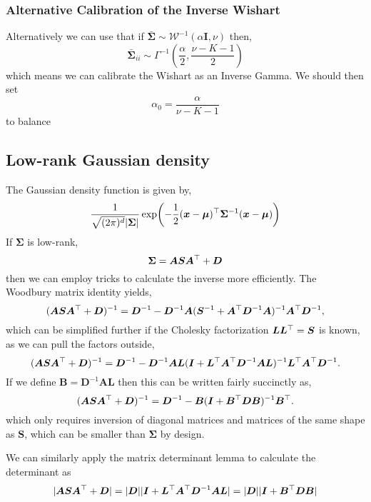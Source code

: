 \documentclass{article}
\newcommand{\mix}{\bm{A}}
\newcommand{\mean}{\mu}
\newcommand{\meanvec}{\bm{\mean}}
\newcommand{\compcov}{\bar{\bm{\Sigma}}}
\begin{document}
\subsubsection{Alternative Calibration of the Inverse Wishart}
Alternatively we can use that if $\compcov\sim \mathcal{W}^{-1}(\alpha\bm{I},\nu)$ then,
\begin{equation}
\compcov_{ii}\sim \Gamma^{-1}\left(\frac{\alpha}{2},\frac{\nu-K-1}{2}\right)
\end{equation}
which means we can calibrate the Wishart as an Inverse Gamma. We should then set 
\begin{equation}
\alpha_0=\frac{\alpha}{\nu-K-1}
\end{equation}
to balance 
\subsection{Low-rank Gaussian density}
\newcommand{\excov}{\bm{\Sigma}}
The Gaussian density function is given by,
\begin{equation}
\frac{1}{\sqrt{(2\pi)^d}|\excov|}\exp(-\frac{1}{2}(\x-\meanvec)\T\excov^{-1}(\x-\meanvec))
\end{equation}
If $\excov$ is low-rank,
\begin{equation}
\excov=\mix\bm{S}\mix\T+\bm{D}
\end{equation}
then we can employ tricks to calculate the inverse more efficiently. The Woodbury matrix identity yields,
\begin{equation}
(\mix\bm{S}\mix\T+\bm{D})^{-1}=\bm{D}^{-1}-\bm{D}^{-1}\mix(\bm{S}^{-1}+\mix\T\bm{D}^{-1}\mix)^{-1}\mix\T\bm{D}^{-1},
\end{equation}
which can be simplified further if the Cholesky factorization $\bm{L}\bm{L}^\top=\bm{S}$ is known, as we can pull the factors outside,
\begin{equation}
(\mix\bm{S}\mix\T+\bm{D})^{-1}=\bm{D}^{-1}-\bm{D}^{-1}\mix\bm{L}(\bm{I}+\bm{L}\T\mix\T\bm{D}^{-1}\mix\bm{L})^{-1}\bm{L}\T\mix\T\bm{D}^{-1}.
\end{equation}
If we define $\bm{B}=\bm{D}^{-1}\mix\bm{L}$ then this can be written fairly succinctly as,
\begin{equation}
(\mix\bm{S}\mix\T+\bm{D})^{-1}=\bm{D}^{-1}-\bm{B}(\bm{I}+\bm{B}\T\bm{D}\bm{B})^{-1}\bm{B}\T.
\end{equation}
which only requires inversion of diagonal matrices and matrices of the same shape as $\bm{S}$, which can be smaller than $\excov$ by design.

We can similarly apply the matrix determinant lemma to calculate the determinant as
\begin{equation}
|\mix\bm{S}\mix\T+\bm{D}|=|\bm{D}||\bm{I}+\bm{L}\T\mix\T\bm{D}^{-1}\mix\bm{L}|=|\bm{D}||\bm{I}+\bm{B}\T\bm{D}\bm{B}|
\end{equation}
\end{document}
